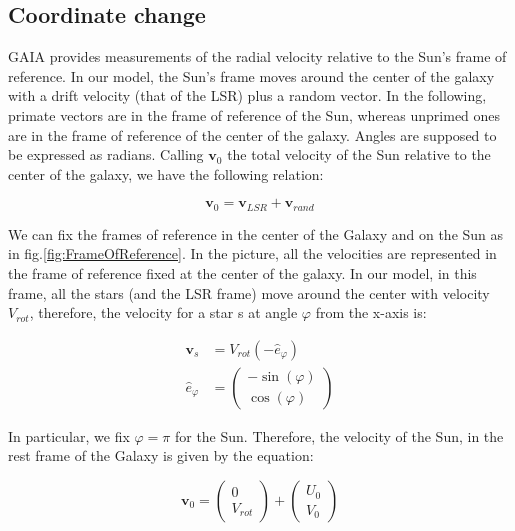 \subsection{Coordinate change}

GAIA provides measurements of the radial velocity relative to the Sun's frame of reference. In our model, the Sun's frame moves around the center of the galaxy with a drift velocity (that of the LSR) plus a random vector.
In the following, primate vectors are in the frame of reference of the Sun, whereas unprimed ones are in the frame of reference of the center of the galaxy. Angles are supposed to be expressed as radians. 
Calling $\bm{v}_0$ the total velocity of the Sun relative to the center of the galaxy, we have the following relation:

\begin{equation}\label{eq:SunVelocity}
    \bm{v}_0 = \bm{v}_{LSR} + \bm{v}_{rand}
\end{equation}

\noindent
We can fix the frames of reference in the center of the Galaxy and on the Sun as in fig.\ref{fig:FrameOfReference}. In the picture, all the velocities are represented in the frame of reference fixed at the center of the galaxy. In our model, in this frame, all the stars (and the LSR frame) move around the center with velocity $V_{rot}$, therefore, the velocity for a star s at angle $\varphi$ from the x-axis is:

\begin{equation}\label{eq:VComponents}
    \begin{aligned}
        \bm{v}_s &= V_{rot} (-\hat{e}_{\varphi}) \\
        \hat{e}_{\varphi} &= \begin{pmatrix} -\sin(\varphi) \\ \cos(\varphi) \end{pmatrix}
    \end{aligned}
\end{equation}

\noindent
In particular, we fix $\varphi = \pi$ for the Sun. Therefore, the velocity of the Sun, in the rest frame of the Galaxy is given by the equation:

\begin{equation}\label{eq:VSun}
    \bm{v}_0 = \begin{pmatrix} 0 \\ V_{rot} \end{pmatrix} + \begin{pmatrix} U_0 \\ V_0 \end{pmatrix}
\end{equation}
 
